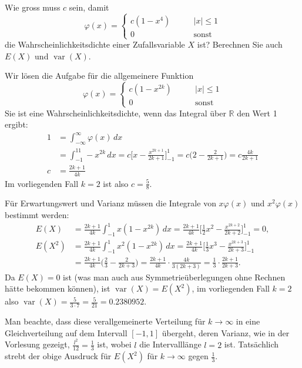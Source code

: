 Wie gross muss $c$ sein, damit
\[
\varphi(x)=\begin{cases}
c(1-x^4)\qquad&|x|\le 1\\
0&\text{sonst}
\end{cases}
\]
die Wahrscheinlichkeitsdichte einer Zufallsvariable $X$ ist? Berechnen 
Sie auch $E(X)$ und $\operatorname{var}(X)$.


\begin{loesung}
Wir lösen die Aufgabe für die allgemeinere Funktion
\[
\varphi(x)=\begin{cases}
c(1-x^{2k})\qquad&|x|\le 1\\
0&\text{sonst}
\end{cases}
\]
Sie ist eine Wahrscheinlichkeitsdichte, wenn das Integral über $\mathbb R$
den Wert 1 ergibt:
\begin{align*}
1&=\int_{-\infty}^{\infty}\varphi(x)\,dx
\\
&=
\int_{-1}^11-x^{2k}\,dx=c\biggl[x-\frac{x^{2k+1}}{2k+1}\biggr]_{-1}^1
=c\biggl(2-\frac{2}{2k+1}\biggr)=c\frac{4k}{2k+1}
\\
c&=\frac{2k+1}{4k}
\end{align*}
Im vorliegenden Fall $k=2$ ist also $c=\frac{5}{8}$.

Für Erwartungswert und Varianz müssen die Integrale von 
$x\varphi(x)$ und $x^2\varphi(x)$ bestimmt werden:
\begin{align*}
E(X)
&=
\frac{2k+1}{4k}
\int_{-1}^1x(1-x^{2k})\,dx
=
\frac{2k+1}{4k}
\biggl[
\frac12x^2-\frac{x^{2k+2}}{2k+2}
\biggr]_{-1}^1=0,
\\
E(X^2)
&=
\frac{2k+1}{4k}\int_{-1}^1x^2(1-x^{2k})\,dx
=
\frac{2k+1}{4k}
\biggl[
\frac13x^3-\frac{x^{2k+3}}{2k+3}
\biggr]_{-1}^1
\\
&=
\frac{2k+1}{4k}
\biggl(
\frac23-\frac{2}{2k+3}
\biggr)
=
\frac{2k+1}{4k}
\cdot
\frac{4k}{3(2k+3)}
=
\frac13\cdot
\frac{2k+1}{2k+3}.
\end{align*}
Da $E(X)=0$ ist (was man auch aus Symmetrieüberlegungen ohne
Rechnen hätte bekommen können), ist $\operatorname{var}(X)=E(X^2)$,
im vorliegenden Fall $k=2$ also 
$\operatorname{var}(X)=\frac{5}{3\cdot 7}=\frac{5}{21}=0.2380952$.

Man beachte, dass diese verallgemeinerte Verteilung für $k\to\infty$
in eine Gleichverteilung auf dem Intervall $[-1,1]$ übergeht, deren
Varianz, wie in der Vorlesung gezeigt, $\frac{l^2}{12}=\frac13$ ist, wobei
$l$ die Intervalllänge $l=2$ ist. Tatsächlich strebt der obige 
Ausdruck für $E(X^2)$ für $k\to\infty$ gegen $\frac13$.
\end{loesung}
